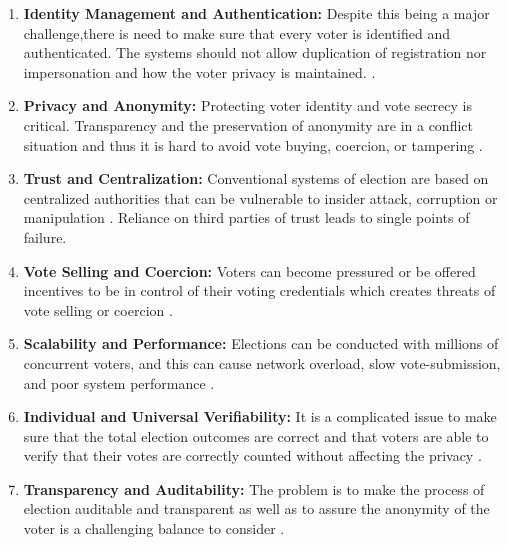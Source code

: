 \documentclass[12pt, a4paper]{report}
\begin{document}
\begin{enumerate}
    \item \textbf{Identity Management and Authentication:} Despite this being a major challenge,there is need to make sure that every voter is identified and authenticated. The systems should not allow duplication of registration nor impersonation and how the voter privacy is maintained. \cite{jetir2025secureblockchain}\cite{sharp2024blockchain_evoting}.
    
    \item \textbf{Privacy and Anonymity:} Protecting voter identity and vote secrecy is critical. Transparency and the preservation of anonymity are in a conflict situation and thus it is hard to avoid vote buying, coercion, or tampering \cite{hajian2024blockchain}\cite{kho2022review}.
    
    \item \textbf{Trust and Centralization:} Conventional systems of election are based on centralized authorities that can be vulnerable to insider attack, corruption or manipulation \cite{hajian2024blockchain}. Reliance on third parties of trust leads to single points of failure.
    
    \item \textbf{Vote Selling and Coercion:}  Voters can become pressured or be offered incentives to be in control of their voting credentials which creates threats of vote selling or coercion \cite{hajian2024blockchain}\cite{wang2024multiparty}.
    
    \item \textbf{Scalability and Performance:} Elections can be conducted with millions of concurrent voters, and this can cause network overload, slow vote-submission, and poor system performance \cite{prajapat2020investigating}\cite{mdpi2022scalability}\cite{abuidris2021secure}.
    
    \item \textbf{Individual and Universal Verifiability:} It is a complicated issue to make sure that the total election outcomes are correct and that voters are able to verify that their votes are correctly counted without affecting the privacy \cite{hajian2024blockchain}\cite{wang2024multiparty}.
    
    \item \textbf{Transparency and Auditability:} The problem is to make the process of election auditable and transparent as well as to assure the anonymity of the voter is a challenging balance to consider \cite{hajian2024blockchain}.
    

\end{enumerate}
\end{document}
